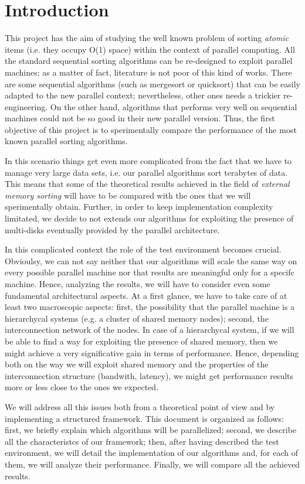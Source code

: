 \section{Introduction}
This project has the aim of studying the well known problem of sorting \textit{atomic} items (i.e. they occupy O(1) space) within the context of parallel computing. All the standard sequential sorting algorithms can be re-designed to exploit parallel machines; as a matter of fact, literature is not poor of this kind of works. There are some sequential algorithms (such as mergesort or quicksort) that can be easily adapted to the new parallel context; nevertheless, other ones needs a trickier re-engineering. On the other hand, algorithms that performs very well on sequential machines could not be so good in their new parallel version. Thus, the first objective of this project is to sperimentally compare the performance of the most known parallel sorting algorithms. 

In this scenario things get even more complicated from the fact that we have to manage very large data sets, i.e. our parallel algorithms sort terabytes of data. This means that some of the theoretical results achieved in the field of \textit{external memory sorting} will have to be compared with the ones that we will sperimentally obtain. Further, in order to keep implementation complexity limitated, we decide to not extends our algorithms for exploiting the presence of multi-disks eventually provided by the parallel architecture. 

In this complicated context the role of the test environment becomes crucial. Obvioulsy, we can not say neither that our algorithms will scale the same way on every possible parallel machine nor that results are meaningful only for a specifc machine. Hence, analyzing the results, we will have to consider even some fundamental architectural aspects. At a first glance, we have to take care of at least two macroscopic aspects: first, the possibility that the parallel machine is a hierarchycal systems (e.g. a cluster of shared memory nodes); second, the interconnection network of the nodes. In case of a hierarchycal system, if we will be able to find a way for exploiting the presence of shared memory, then we might achieve a very significative gain in terms of performance. Hence, depending both on the way we will exploit shared memory and the properties of the interconnection structure (bandwith, latency), we might get performance results more or less close to the ones we expected.

We will address all this issues both from a theoretical point of view and by implementing a structured framework. This document is organized as follows: first, we briefly explain which algorithms will be parallelized; second, we describe all the characteristcs of our framework; then, after having described the test environment, we will detail the implementation of our algorithms and, for each of them, we will analyze their performance. Finally, we will compare all the achieved results.
